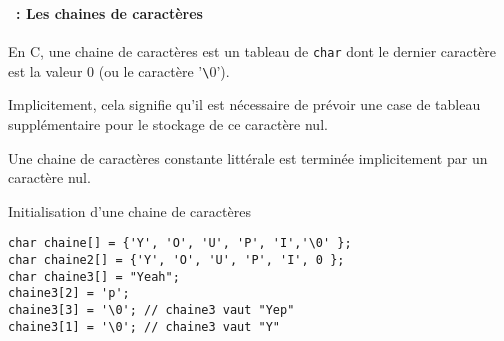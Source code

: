 \begin{frame}[containsverbatim]
  \frametitle{\secname}
  \framesubtitle{\subsecname~: Les chaines de caractères}

  En C, une chaine de caractères est un tableau de \texttt{char} dont le dernier caractère est la valeur 0 (ou le caractère '\verb|\|0').
  \vspace{0.3cm}
  \par
  Implicitement, cela signifie qu'il est nécessaire de prévoir une case de tableau supplémentaire pour le stockage de ce caractère nul.
  \vspace{0.5cm}
  \par
  Une chaine de caractères constante littérale est terminée implicitement par un caractère nul.
  \begin{exampleblock}{Initialisation d'une chaine de caractères}
    \begin{verbatim}
char chaine[] = {'Y', 'O', 'U', 'P', 'I','\0' };
char chaine2[] = {'Y', 'O', 'U', 'P', 'I', 0 };
char chaine3[] = "Yeah";
chaine3[2] = 'p'; 
chaine3[3] = '\0'; // chaine3 vaut "Yep"
chaine3[1] = '\0'; // chaine3 vaut "Y"\end{verbatim}
  \end{exampleblock}
\end{frame}

